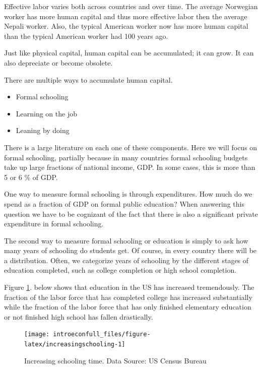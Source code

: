 \documentclass[
]{book}
\providecommand{\tightlist}{%
  \setlength{\itemsep}{0pt}\setlength{\parskip}{0pt}}
\begin{document}
Effective labor varies both across countries and over time. The average Norwegian worker has more human capital and thus more effective labor then the average Nepali worker. Also, the typical American worker now has more human capital than the typical American worker had 100 years ago.

Just like physical capital, human capital can be accumulated; it can grow. It can also depreciate or become obsolete.

There are multiple ways to accumulate human capital.

\begin{itemize}
\tightlist
\item
  Formal schooling
\item
  Learning on the job
\item
  Leaning by doing
\end{itemize}

There is a large literature on each one of these components. Here we will focus on formal schooling, partially because in many countries formal schooling budgets take up large fractions of national income, GDP. In some cases, this is more than 5 or 6 \% of GDP.

One way to measure formal schooling is through expenditures. How much do we spend as a fraction of GDP on formal public education? When answering this question we have to be cognizant of the fact that there is also a significant private expenditure in formal schooling.

The second way to measure formal schooling or education is simply to ask how many years of schooling do students get. Of course, in every country there will be a distribution. Often, we categorize years of schooling by the different stages of education completed, such as college completion or high school completion.

Figure \ref{fig:increasingschooling}. below shows that education in the US has increased tremendously. The fraction of the labor force that has completed college has increased substantially while the fraction of the labor force that has only finished elementary education or not finished high school has fallen drastically.

\begin{figure}

{\centering \texttt{[image: introeconfull\_files/figure-latex/increasingschooling-1]} 

}

\caption{Increasing schooling time. Data Source: US Census Bureau}\label{fig:increasingschooling}
\end{figure}
\end{document}

